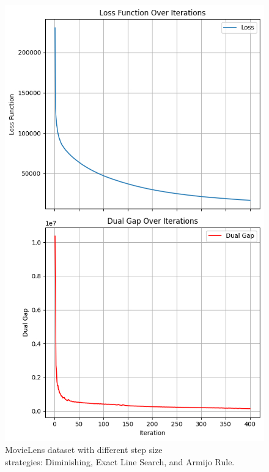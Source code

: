 \documentclass[12pt]{beamer}
\begin{document}
\begin{frame}
\begin{figure}[H]
        \includegraphics[height=0.75\textheight]{image/movielens_loss_gap_armijo.png}
        \caption{MovieLens dataset with different step size \\
        strategies: Diminishing, Exact Line Search, and Armijo Rule.}
    \end{figure}
\end{frame}
\end{document}
